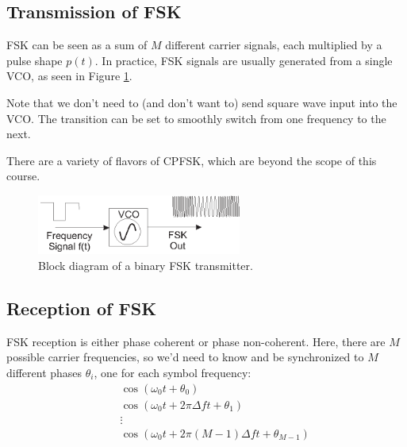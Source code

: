 \subsection{Transmission of FSK}

FSK can be seen as a sum of $M$ different carrier signals, each multiplied by a pulse shape $p(t)$.  In practice, FSK signals are usually generated from a single VCO, as seen in Figure
\ref{F:FSK-TX-BlockDiagram}.


Note that we don't need to (and don't want to) send square wave input into the VCO.  The transition can be set to smoothly switch from one frequency to the next.


There are a variety of flavors of CPFSK, which are beyond the scope of this course.

\begin{figure}[htbp]
  \centerline{\includegraphics[width=0.6\textwidth]{../images/FSK-BlockDiagram.eps}}
  \caption{Block diagram of a binary FSK transmitter.}
  \label{F:FSK-TX-BlockDiagram}
\end{figure}

\subsection{Reception of FSK}

FSK reception is either phase coherent or phase non-coherent.  Here,
there are $M$ possible carrier frequencies, so we'd need to know and
be synchronized to $M$ different phases $\theta_i$, one for each
symbol frequency:
\begin{eqnarray}
  && \cos(\omega_0 t  + \theta_0)
    \nonumber \\
  && \cos(\omega_0 t  + 2\pi \Delta f t + \theta_1)
    \nonumber \\
    &  & \vdots \nonumber \\
  && \cos(\omega_0 t + 2\pi (M-1)\Delta f t + \theta_{M-1})
    \nonumber
\end{eqnarray}

